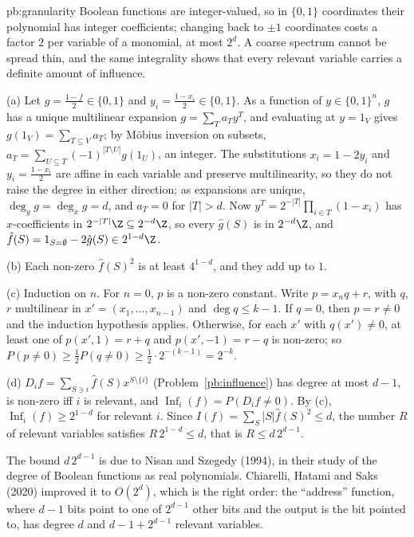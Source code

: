 \begin{solution}{pb:granularity}
\idea Boolean functions are integer-valued, so in $\{0,1\}$ coordinates their polynomial has integer coefficients; changing back to
$\pm1$ coordinates costs a factor $2$ per variable of a monomial, at most $2^d$. A coarse spectrum cannot be spread thin, and the
same integrality shows that every relevant variable carries a definite amount of influence.

\writeup (a) Let $g=\frac{1-f}2\in\{0,1\}$ and $y_i=\frac{1-x_i}2\in\{0,1\}$. As a function of $y\in\{0,1\}^n$, $g$ has a unique multilinear expansion
$g=\sum_Ta_Ty^T$, and evaluating at $y=1_V$ gives $g(1_V)=\sum_{T\subseteq V}a_T$; by Möbius inversion on subsets, $a_T=\sum_{U\subseteq T}(-1)^{|T\setminus U|}g(1_U)$,
an integer. The substitutions $x_i=1-2y_i$ and $y_i=\frac{1-x_i}2$ are affine in each variable and preserve multilinearity, so they do not
raise the degree in either direction; as expansions are unique, $\deg_yg=\deg_xg=d$, and $a_T=0$ for $|T|>d$. Now
$y^T=2^{-|T|}\prod_{i\in T}(1-x_i)$ has $x$-coefficients in $2^{-|T|}\Z\subseteq2^{-d}\Z$, so every $\hat g(S)$ is in $2^{-d}\Z$, and $\hat f(S)=1_{S=\emptyset}-2\hat g(S)\in2^{1-d}\Z$.

(b) Each non-zero $\hat f(S)^2$ is at least $4^{1-d}$, and they add up to $1$.

(c) Induction on $n$. For $n=0$, $p$ is a non-zero constant. Write $p=x_nq+r$, with $q$, $r$ multilinear in $x'=(x_1,\dots,x_{n-1})$ and
$\deg q\le k-1$. If $q=0$, then $p=r\ne0$ and the induction hypothesis applies. Otherwise, for each $x'$ with $q(x')\ne0$, at least one
of $p(x',1)=r+q$ and $p(x',-1)=r-q$ is non-zero; so $P(p\ne0)\ge\frac12P(q\ne0)\ge\frac12\cdot2^{-(k-1)}=2^{-k}$.

(d) $D_if=\sum_{S\ni i}\hat f(S)x^{S\setminus\{i\}}$ (Problem~\ref{pb:influence}) has degree at most $d-1$, is non-zero iff $i$ is relevant, and
$\operatorname{Inf}_i(f)=P(D_if\ne0)$. By (c), $\operatorname{Inf}_i(f)\ge2^{1-d}$ for relevant $i$. Since $I(f)=\sum_S|S|\hat f(S)^2\le d$, the number $R$ of relevant variables
satisfies $R\,2^{1-d}\le d$, that is $R\le d\,2^{d-1}$.

\leads The bound $d\,2^{d-1}$ is due to Nisan and Szegedy (1994), in their study of the degree of Boolean functions as real
polynomials. Chiarelli, Hatami and Saks (2020) improved it to $O(2^d)$, which is the right order: the ``address'' function, where $d-1$
bits point to one of $2^{d-1}$ other bits and the output is the bit pointed to, has degree $d$ and $d-1+2^{d-1}$ relevant variables.
\end{solution}


